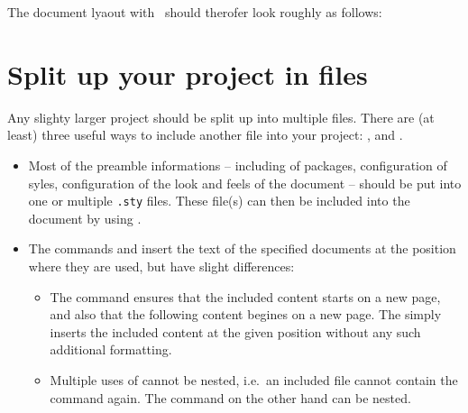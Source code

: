 The document lyaout with~ should therofer look roughly as follows:







\section{Split up your project in files}

Any slighty larger project should be split up into multiple files.
There are (at least) three useful ways to include another file into your project: ,  and .
\begin{itemize}[leftmargin=*]
  \item
    Most of the preamble informations -- including of packages, configuration of syles, configuration of the look and feels of the document -- should be put into one or multiple \texttt{.sty} files.
    These file(s) can then be included into the document by using .
  \item
    The commands  and  insert the text of the specified documents at the position where they are used, but have slight differences:
    \begin{itemize}[label = \textopenbullet, leftmargin=*]
      \item
        The  command ensures that the included content starts on a new page, and also that the following content begines on a new page.
        The  simply inserts the included content at the given position without any such additional formatting.
      \item
        Multiple uses of  cannot be nested, i.e.\ an included file cannot contain the  command again.
        The  command on the other hand can be nested.
        
    \end{itemize}
\end{itemize}

